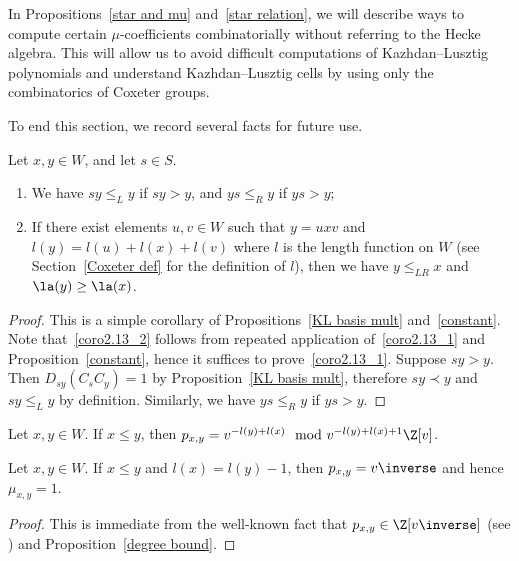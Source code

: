 In Propositions~\ref{star and mu} and~\ref{star relation}, we will describe
ways to compute certain
$\mu$-coefficients combinatorially without referring to the Hecke algebra.
This will allow us to avoid difficult computations of Kazhdan--Lusztig
polynomials and understand Kazhdan--Lusztig cells by using only the combinatorics of
Coxeter groups.

To end this section, we record several facts for future use.

\begin{coro} \label{weak order} Let $x,y\in W$, and let $s\in
S$. 
\begin{enumerate} 
\item\label{coro2.13_1} We have $sy\le_L y$ if $sy>y$, and $ys\le_R y$ if $ys>y$;
\item\label{coro2.13_2} If there exist elements $u,v\in W$ such that $y=uxv$ and
 $l(y)=l(u)+l(x)+l(v)$ where $l$ is the length function on
 $W$ \textup{(}see Section~\ref{Coxeter def} for the definition of
 $l$\textup{)}, then
 we have $y\le_{LR}x$ and $\la(y)\ge \la(x)$. 
 \end{enumerate} 
 \end{coro}
 \begin{proof} 
 This is a simple corollary of Propositions~\ref{KL basis
 mult} and~\ref{constant}. Note that~\eqref{coro2.13_2} follows from repeated application of~\eqref{coro2.13_1} and
 Proposition~\ref{constant}, hence it suffices to prove~\eqref{coro2.13_1}. Suppose
 $sy>y$. Then $D_{sy}(C_sC_y)=1$ by Proposition~\ref{KL basis mult},
 therefore $sy\prec y$ and $sy\le_L y$ by definition. Similarly,
 we have $ys\le_R y$ if $ys>y$. \end{proof}


 \begin{prop}[{\cite[Proposition~5.4]{LG}}]
 \label{degree bound}
 Let $x,y\in W$. If $x\le y$, then $p_{x,y}=v^{-l(y)+l(x)}\mod
 v^{-l(y)+l(x)+1}\Z[v]$.
 \end{prop}

 \begin{coro}
 \label{difference 1}
 Let $x,y\in W$. If $x\le y$ and $l(x)=l(y)-1$, then $p_{x,y}=v\inverse$
 and hence $\mu_{x,y}=1$.
 \end{coro}
 \begin{proof}
 This is immediate from the
 well-known fact that $p_{x,y}\in \Z[v\inverse]$ (see \cite[Section~5.3]{LG}) and Proposition~\ref{degree bound}.
 \end{proof}

